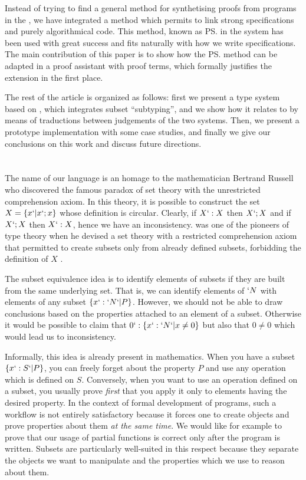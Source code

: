 \documentclass{llncs}
\begin{document}
Instead of trying to find a general method for synthetising proofs from
programs in the \CICfull, we have integrated a method which permits to
link strong specifications and purely algorithmical code. This method,
known as \ps{} in the \PVS{} system has been used with great success and
fits naturally with how we write specifications. The main contribution
of this paper is to show how the \ps{} method can be adapted in a proof
assistant with proof terms, which formally justifies the extension in
the first place.

The rest of the article is organized as follows: first we present a
type system based on \CC, which integrates subset ``subtyping'', and
we show how it relates to \CIC{} by means of traductions between
judgements of the two systems. Then, we present a prototype
implementation with some case studies, and finally we give our
conclusions on this work and discuss future directions.

\section{\Russell{}}
The name of our language is an homage to the mathematician Bertrand Russell who
discovered the famous paradox of set theory with the unrestricted
comprehension axiom. In this theory, it is possible to construct the set
$X = \{x `| x `; x\}$ whose definition is circular. Clearly, if $X `: X$
then $X `; X$ and if $X `; X$ then $X `: X$, hence we have an
inconsistency. \Russell{} was one of the pioneers of type theory when he
devised a set theory with a restricted comprehension axiom that
permitted to create subsets only from already defined subsets,
forbidding the definition of $X$ \cite{whitehead.russell:principia}. 

The subset equivalence idea is to identify elements of subsets if
they are built from the same underlying set. That is, we can identify
elements of $`N$ with elements of any subset $\{ x `: `N `| P \}$.
However, we should not be able to draw conclusions based on the
properties attached to an element of a subset. Otherwise it would be
possible to claim that $0 `: \{ x `: `N `| x \neq 0 \}$ but also that $0
\neq 0$ which would lead us to inconsistency. 

Informally, this idea is already present in mathematics. When you have a
subset $\{ x `: S `| P \}$, you can freely forget about the property $P$
and use any operation which is defined on $S$. Conversely, when you
want to use an operation defined on a subset, you usually prove \emph{first}
that you apply it only to elements having the desired property. 
In the context of formal development of programs, such a workflow is not
entirely satisfactory because it forces one to create objects and prove
properties about them \emph{at the same time}. We would like for example
to prove that our usage of partial functions is correct only after the
program is written. Subsets are particularly well-suited in this respect
because they separate the objects we want to manipulate and the
properties which we use to reason about them.
\end{document}
